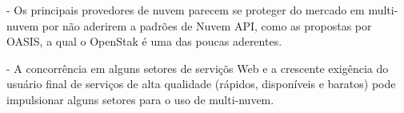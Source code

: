 \documentclass[12pt]{article}
\begin{document}
	- Os principais provedores de nuvem parecem se proteger do mercado em multi-nuvem por não aderirem a padrões de Nuvem API, como as propostas por OASIS, a qual o OpenStak é uma das poucas aderentes.
	
	- A concorrência em alguns setores de serviçõs Web e a crescente exigência do usuário final de serviços de alta qualidade (rápidos, disponíveis e baratos) pode impulsionar alguns setores para o uso de multi-nuvem.	
	
	
	
	
	
	
	
	
	
	\nocite{Bond:2015}
	
	\newpage
		
	
	
\end{document}

